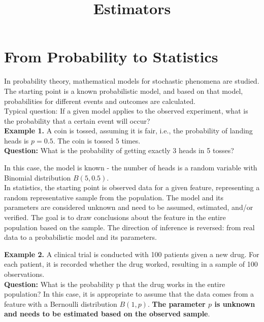 \documentclass[a4paper, 12pt]{article}
\title{
  \vspace{-1.5cm}
  \textbf{Estimators}
  \vspace{-1.5cm}
}
\date{}
\begin{document}
\maketitle

\section{From Probability to Statistics}

In probability theory, mathematical models for stochastic phenomena are studied. The starting point is a known probabilistic model, and based on that model, probabilities for different events and outcomes are calculated.\\

Typical question: If a given model applies to the observed experiment, what is the
probability that a certain event will occur?\\

\textbf{Example 1.} A coin is tossed, assuming it is fair, i.e., the probability of landing heads is $p = 0.5$. The coin is tossed $5$ times.\\

\textbf{Question:} What is the probability of getting exactly 3 heads in 5 tosses?

In this case, the model is known - the number of heads is a random variable with
Binomial distribution $B(5, 0.5)$.\\


In statistics, the starting point is observed data for a given feature, representing a
random representative sample from the population. The model and its parameters are
considered unknown and need to be assumed, estimated, and/or verified. The goal is to
draw conclusions about the feature in the entire population based on the sample. The
direction of inference is reversed: from real data to a probabilistic model and its
parameters.

\textbf{Example 2.} A clinical trial is conducted with 100 patients given a new drug. For each patient, it is recorded whether the drug worked, resulting in a sample of 100 observations.\\

\textbf{Question:} What is the probability p that the drug works in the entire population? In this case, it is appropriate to assume that the data comes from a feature with a Bernoulli distribution $B(1, p)$. \textbf{The parameter $p$ is unknown and needs to be estimated based on the observed sample}.
\end{document}
